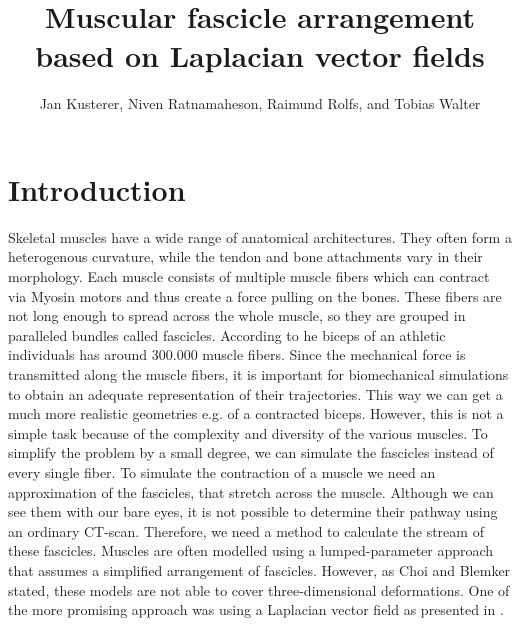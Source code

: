 \documentclass[preprint,journal]{vgtc}       %
\title{Muscular fascicle arrangement based on Laplacian vector fields}
\author{Jan Kusterer, Niven Ratnamaheson, Raimund Rolfs, and Tobias Walter}
\begin{document}
\maketitle

\section{Introduction}\label{sec:intro}
Skeletal muscles have a wide range of anatomical architectures. They often form a heterogenous curvature, while the tendon and bone attachments vary in their morphology. Each muscle consists of multiple muscle fibers which can contract via Myosin motors \cite{Jiangcheng2015} and thus create a force pulling on the bones. These fibers are not long enough to spread across the whole muscle, so they are grouped in paralleled bundles called fascicles. 
According to \cite{Etemadi.et.Al.} he biceps of an athletic individuals has around 300.000 muscle fibers.  Since the mechanical force is transmitted along the muscle fibers, it is important for biomechanical simulations to obtain an adequate representation of their trajectories. This way we can get a much more realistic geometries e.g. of a contracted biceps. However, this is not a simple task because of the complexity and diversity of the various muscles. To simplify the problem by a small degree, we can simulate the fascicles instead of every single fiber. 
To simulate the contraction of a muscle we need an approximation of the fascicles, that stretch across the muscle. Although we can see them with our bare eyes, it is not possible to determine their pathway using an ordinary CT-scan. 
Therefore, we need a method to calculate the stream of these fascicles. Muscles are often modelled using a lumped-parameter approach that assumes a simplified arrangement of fascicles. However, as Choi and Blemker stated, these models are not able to cover three-dimensional deformations.
One of the more promising approach was using a Laplacian vector field as presented in \cite{Choi2013}.

%
%
%
\end{document}
